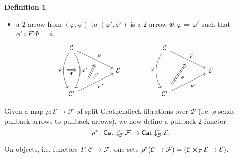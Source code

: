 \documentclass[a4paper,10pt
,draft
]{article}%
\numberwithin{equation}{section}
\numberwithin{figure}{section}
\theoremstyle{definition} %
\newtheorem{definition}[equation]{Definition}%
\newcommand{\1}{\ensuremath{\mathbbm 1}}%
\begin{document}
\begin{definition}
\begin{itemize}
	\item a $2$-arrow from $(\varphi,\phi)$ to $(\varphi',\phi')$ is a $2$-arrow $\Phi \colon \varphi \Rightarrow \varphi'$ such that
	$\phi' \circ F' \Phi = \phi$.
		\begin{equation}
		\begin{tikzcd}[column sep = 50pt]
			\mathcal{C} \arrow{dr}[name=U]{F} 
			\arrow[bend right]{dd}[swap]{\varphi}[name=F]{}
			\arrow[bend left]{dd}{\varphi'}[swap,name=FF]{}
			&
		&
			\mathcal{C} \arrow{dr}[name=U2]{F} 
			\arrow[bend right]{dd}[swap]{\varphi}
			&
		\\
			& \mathcal{E}
		&
			& \mathcal{E}
		\\
			\mathcal{C}' \arrow{ur}[swap]{F'}[near start, name=V]{}
			&
		&
			|[alias=V2]| \mathcal{C}' \arrow{ur}[swap]{F'}
			&
		\arrow[Rightarrow, from=V, to=U,shorten >=0.25cm,shorten <=0.25cm
		,swap,"\phi'"
		]
		\arrow[Rightarrow, from=F, to=FF,shorten >=0.0cm,shorten <=0.0cm
		,swap,"\Phi"
		]
		\arrow[Rightarrow, from=V2, to=U2,shorten >=0.25cm,shorten <=0.25cm
		,swap,"\phi"
		]
		\end{tikzcd}
		\end{equation}
\end{itemize}
\end{definition}


Given a map $\rho \colon \mathcal{E} \to \mathcal{F}$
of split Grothendieck fibrations over $\mathcal{B}$
(i.e. $\rho$ sends pullback arrows to pullback arrows),
we now define a pullback $2$-functor 
\begin{equation}\label{WSPANPULL EQ}
\rho^{\**} \colon
\mathsf{Cat} \downarrow^r_\mathcal{B} \mathcal{F} 
	\to
\mathsf{Cat} \downarrow^r_\mathcal{B} \mathcal{E}.
\end{equation}

On objects, i.e. functors $F \colon \mathcal{C} \to \mathcal{F}$, one sets 
$\rho^{\**}(\mathcal{C} \to \mathcal{F})=
(\mathcal{C} \times_{\mathcal{F}} \mathcal{E}
\to \mathcal{E})
$.
\end{document}
